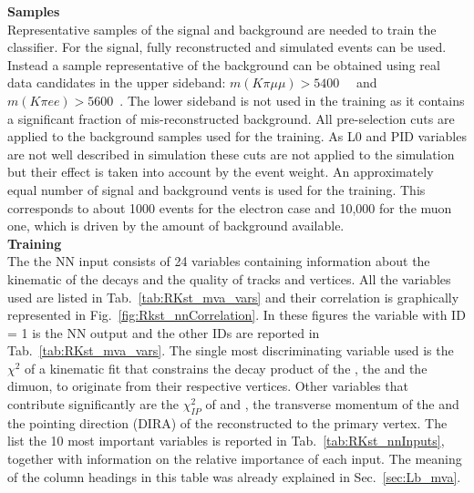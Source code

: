 {\bf Samples}
\\

Representative samples of the signal and background are needed to train the classifier.
For the signal, fully reconstructed \BdToKstmm and \BdKstee simulated events can be used.
Instead a sample representative of the background can be obtained using real data candidates
in the upper \Bz sideband: $m(K\pi\mu\mu) > 5400$~\mevcc~ and $m(K\pi ee) > 5600$~\mevcc.
The lower sideband is not used in the training as it contains a significant fraction of mis-reconstructed background.
All pre-selection cuts are applied to the background samples used for the training.
As L0 and PID variables are not well described in simulation these cuts are not applied to the simulation
but their effect is taken into account by the event weight.
An approximately equal number of signal and background vents is used for the training.
This corresponds to about 1000 events for the electron case and 10,000 for the muon one, which
is driven by the amount of background available.
\\

{\bf Training}
\\

The the NN input consists of 24 variables containing information about the kinematic of the decays
and the quality of tracks and vertices. All the variables used are listed in Tab.~\ref{tab:RKst_mva_vars} and
their correlation is graphically represented in Fig.~\ref{fig:Rkst_nnCorrelation}.
In these figures the variable with ID = 1 is the NN output and the other IDs are reported in Tab.~\ref{tab:RKst_mva_vars}.
%
The single most discriminating variable used is the $\chi^2$ of a kinematic fit
that constrains the decay product of the \Bz, the \Kstarz and the dimuon, to originate from their respective vertices.
Other variables that contribute significantly are the $\chi^2_{IP}$ of \jpsi and \Kstarz, the transverse momentum
of the \Bz and the pointing direction (DIRA) of the reconstructed \Bz to the primary vertex.
The list the 10 most important variables is reported in Tab.~\ref{tab:RKst_nnInputs}, together
with information on the relative importance of each input. The meaning of the column headings
in this table was already explained in Sec.~\ref{sec:Lb_mva}.

